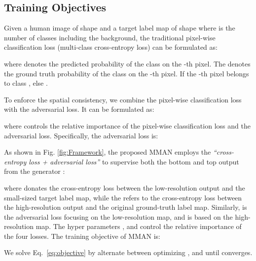 \documentclass[runningheads]{llncs}
\begin{document}
\subsection{Training Objectives} \label{sec:obj}
Given a  human image  of shape   and a target label map  of shape  where  is the number of classes including the background, the traditional pixel-wise classification loss (multi-class cross-entropy loss) can be formulated as:

where  denotes the predicted probability of the class  on the -th pixel. The  denotes the ground truth probability of the class  on the -th pixel. If the -th pixel belongs to class ,  else .

To enforce the spatial consistency, we combine the pixel-wise classification loss with the adversarial loss. It can be formulated as:

where  controls the relative importance of the pixel-wise classification loss and the adversarial loss. Specifically, the adversarial loss  is:


As shown in Fig. \ref{fig:Framework}, the proposed MMAN employs the \emph{``cross-entropy loss + adversarial loss''} to supervise both the bottom and top output from the generator :

where  donates the cross-entropy loss between the low-resolution output and the small-sized target label map, while the  refers to the cross-entropy loss between the high-resolution output and the original ground-truth label map.
Similarly,  is the adversarial loss focusing on the low-resolution map, and  is based on the high-resolution map.
The hyper parameters ,  and   control the relative importance of the four losses. The training objective of MMAN is:



We solve Eq.~\ref{eq:objective} by alternate between optimizing ,  and  until  converges.
\end{document}
